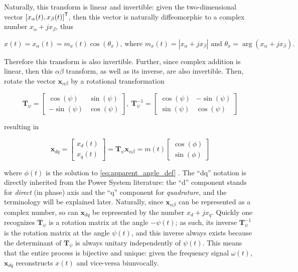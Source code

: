 	Naturally, this transform is linear and invertible: given the two-dimensional vector $\left[x_\alpha(t),x_\beta(t)\right]^{\mathsf{T}}$, then this vector is naturally diffeomorphic to a complex number $x_\alpha + jx_\beta$, thus

\begin{equation} x(t) = x_\alpha(t) = m_x(t)\cos\left(\theta_x\right) \text{, where } m_x(t) = \left\lvert x_\alpha + jx_\beta\right\rvert \text{ and } \theta_x = \arg\left(x_\alpha + jx_\beta\right) .\end{equation}

	Therefore this transform is also invertible. Further, since complex addition is linear, then this $\alpha\beta$ transform, as well as its inverse, are also invertible. Then, rotate the vector $\mathbf{x}_{\alpha\beta}$ by a rotational transformation

\begin{equation} \mathbf{T}_\psi = \left[\begin{array}{cc} \cos\left(\psi\right) & \sin\left(\psi\right) \\[3mm] -\sin\left(\psi\right) & \cos\left(\psi\right)\end{array}\right],\ \mathbf{T}_\psi^{-1} = \left[\begin{array}{cc} \cos\left(\psi\right) & -\sin\left(\psi\right) \\[3mm] \sin\left(\psi\right) & \cos\left(\psi\right)\end{array}\right]  \end{equation}

	\noindent resulting in

\begin{equation} \mathbf{x}_{dq} = \left[\begin{array}{c} x_d(t)\\[3mm] x_q(t) \end{array}\right] = \mathbf{T}_\psi\mathbf{x}_{\alpha\beta} = m(t)\left[\begin{array}{c} \cos\left(\phi\right) \\[3mm] \sin\left(\phi\right) \end{array}\right] \end{equation}

	\noindent where $\phi(t)$ is the solution to \eqref{eq:apparent_angle_def} . The ``dq'' notation is directly inherited from the Power System literature: the ``d'' component stands for \textit{direct} (in phase) axis and the ``q'' component for \textit{quadrature}, and the terminology will be explained later. Naturally, since $\mathbf{x}_{\alpha\beta}$ can be represented as a complex number, so can $\mathbf{x}_{dq}$ be represented by the number $x_d + jx_q$. Quickly one recognizes $\mathbf{T}_\psi$ is a rotation matrix at the angle $-\psi(t)$; as such, its inverse $\mathbf{T}_\psi^{-1}$ is the rotation matrix at the angle $\psi(t)$, and this inverse always exists because the determinant of $\mathbf{T}_\psi$ is always unitary independently of $\psi(t)$. This means that the entire process is bijective and unique: given the frequency signal $\omega(t)$, $\mathbf{x}_{dq}$ reconstructs $x(t)$ and vice-versa biunvocally.

